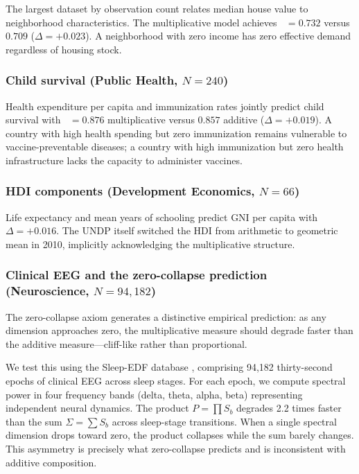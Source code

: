 \documentclass[12pt, a4paper]{article}
\theoremstyle{definition}
\theoremstyle{remark}
\DeclareMathOperator{\Spearman}{\rho_s}
\begin{document}
The largest dataset by observation count relates median house value to neighborhood characteristics. The multiplicative model achieves $\Spearman = 0.732$ versus $0.709$ ($\Delta = +0.023$). A neighborhood with zero income has zero effective demand regardless of housing stock.

\subsubsection{Child survival (Public Health, $N = 240$)}

Health expenditure per capita and immunization rates jointly predict child survival with $\Spearman = 0.876$ multiplicative versus $0.857$ additive ($\Delta = +0.019$). A country with high health spending but zero immunization remains vulnerable to vaccine-preventable diseases; a country with high immunization but zero health infrastructure lacks the capacity to administer vaccines.

\subsubsection{HDI components (Development Economics, $N = 66$)}

Life expectancy and mean years of schooling predict GNI per capita with $\Delta = +0.016$. The UNDP itself switched the HDI from arithmetic to geometric mean in 2010, implicitly acknowledging the multiplicative structure.

\subsubsection{Clinical EEG and the zero-collapse prediction (Neuroscience, $N = 94{,}182$)}\label{sec:eeg}

The zero-collapse axiom generates a distinctive empirical prediction: as any dimension approaches zero, the multiplicative measure should degrade faster than the additive measure---cliff-like rather than proportional.

We test this using the Sleep-EDF database \cite{goldberger2000}, comprising 94,182 thirty-second epochs of clinical EEG across sleep stages. For each epoch, we compute spectral power in four frequency bands (delta, theta, alpha, beta) representing independent neural dynamics. The product $P = \prod S_b$ degrades 2.2 times faster than the sum $\Sigma = \sum S_b$ across sleep-stage transitions. When a single spectral dimension drops toward zero, the product collapses while the sum barely changes. This asymmetry is precisely what zero-collapse predicts and is inconsistent with additive composition.
\end{document}
